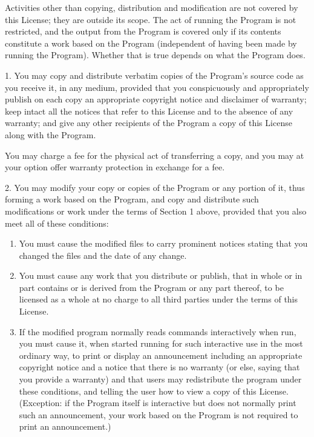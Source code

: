 \documentclass[a4paper, 11pt, twoside]{article}
\begin{document}
Activities other than copying, distribution and modification are not covered by this License; they are outside its scope. The act of running the Program is not restricted, and the output from the Program is covered only if its contents constitute a work based on the Program (independent of having been made by running the Program). Whether that is true depends on what the Program does.

1. You may copy and distribute verbatim copies of the Program's source code as you receive it, in any medium, provided that you conspicuously and appropriately publish on each copy an appropriate copyright notice and disclaimer of warranty; keep intact all the notices that refer to this License and to the absence of any warranty; and give any other recipients of the Program a copy of this License along with the Program.

You may charge a fee for the physical act of transferring a copy, and you may at your option offer warranty protection in exchange for a fee.

2. You may modify your copy or copies of the Program or any portion of it, thus forming a work based on the Program, and copy and distribute such modifications or work under the terms of Section 1 above, provided that you also meet all of these conditions:

\begin{enumerate}[label=\Alph*)]
\item You must cause the modified files to carry prominent notices stating that you changed the files and the date of any change.
\item You must cause any work that you distribute or publish, that in whole or in part contains or is derived from the Program or any part thereof, to be licensed as a whole at no charge to all third parties under the terms of this License.
\item If the modified program normally reads commands interactively when run, you must cause it, when started running for such interactive use in the most ordinary way, to print or display an announcement including an appropriate copyright notice and a notice that there is no warranty (or else, saying that you provide a warranty) and that users may redistribute the program under these conditions, and telling the user how to view a copy of this License. (Exception: if the Program itself is interactive but does not normally print such an announcement, your work based on the Program is not required to print an announcement.)
\end{enumerate}
\end{document}

